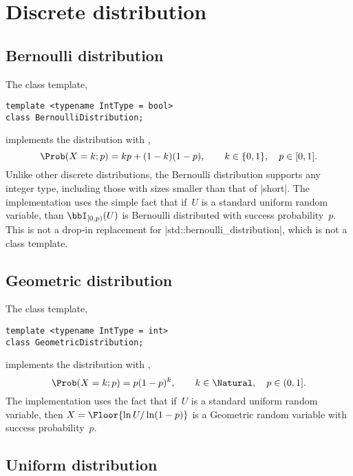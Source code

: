 \section{Discrete distribution}
\label{sec:Discrete distribution}

\subsection{Bernoulli distribution}
\label{sub:Bernoulli distribution}

The class template,
\begin{verbatim}
template <typename IntType = bool>
class BernoulliDistribution;
\end{verbatim}
implements the distribution with \pdf,
\begin{equation*}
  \Prob(X = k;p) = kp + (1 - k)(1 - p),\qquad
  k \in \{0, 1\},\quad p \in [0, 1].
\end{equation*}
Unlike other discrete distributions, the Bernoulli distribution supports any
integer type, including those with sizes smaller than that of |short|. The
implementation uses the simple fact that if~$U$ is a standard uniform random
variable, than $\bbI_{[0,p)}(U)$ is Bernoulli distributed with success
probability~$p$. This is not a drop-in replacement for
|std::bernoulli_distribution|, which is not a class template.

\subsection{Geometric distribution}
\label{sub:Geometric distribution}

The class template,
\begin{verbatim}
template <typename IntType = int>
class GeometricDistribution;
\end{verbatim}
implements the distribution with \pdf,
\begin{equation*}
  \Prob(X = k;p) = p(1-p)^k,\qquad
  k \in \Natural,\quad p \in (0, 1].
\end{equation*}
The implementation uses the fact that if~$U$ is a standard uniform random
variable, then $X = \Floor{\ln U / \ln(1-p)}$ is a Geometric random variable
with success probability~$p$.

\subsection{Uniform distribution}
\label{sub:Uniform distribution}

